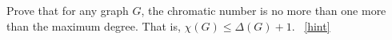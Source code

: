 \documentclass{book}
\begin{document}
\setcounter{project}{45}
\addtocounter{project}{-1}
\begin{activity}[]\label{activity-38}
\hypertarget{p-417}{}%
Prove that for any graph \(G\), the chromatic number is no more than one more than the maximum degree.  That is, \(\chi(G) \le \Delta(G) + 1\).%
~\hfill{\tiny\hyperlink{a-45}{[hint]}\hypertarget{q-45}{}}\end{activity}
\end{document}
